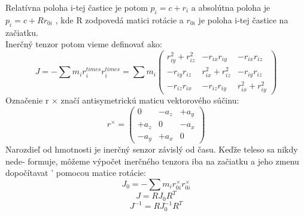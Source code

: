 \documentclass[paper=a4, fontsize=11pt]{scrartcl} %
\numberwithin{equation}{section} %
\numberwithin{figure}{section} %
\numberwithin{table}{section} %
\begin{document}
Relatívna poloha i-tej častice je potom $p_i = c + r_i$ a absolútna poloha je $p_i = c + Rr_{0i}$ ,
kde R zodpovedá matici rotácie a $r_{0i}$ je poloha i-tej častice na začiatku. \\
Inerčný tenzor potom vieme definovať ako:
$$ J = - \sum m_i r_{i}^{times} r_{i}^{times} = \sum m_i 
\begin{pmatrix}
r_{iy}^{2}+r_{iz}^{2}	&	-r_{ix}r_{iy}	& 	-r_{ix}r_{iz}\\
-r_{iy}r_{iz}			&	r_{ix}^{2}+r_{iz}^{2} 	& -r_{iy}r_{iz} \\
-r_{iz}r_{ix}			& 	-r_{iz}r_{iy}	& r_{ix}^{2}+r_{iy}^{2}
\end{pmatrix}
$$
Označenie r × značí antisymetrickú maticu vektorového súčinu:
$$
r^{\times} = 
\begin{pmatrix}
0	& -a_z	& +a_y	\\
+a_z	&	0	&	-a_x	\\
-a_y	&	+a_x	&	0
\end{pmatrix}
$$
Narozdieľ od hmotnosti je inerčný senzor závislý od času. Keďže teleso sa nikdy nede-
formuje, môžeme výpočet inerčného tenzora iba na začiatku a jeho zmenu dopočítavat ’
pomocou matice rotácie:
$$J_0 = - \sum m_i r_{0i}^{\times} r_{0i}^{\times} $$
$$ J = RJ_{0}R^{T} $$
$$ J^{-1} = RJ_{0}^{-1}R^{T}$$



\end{document}
